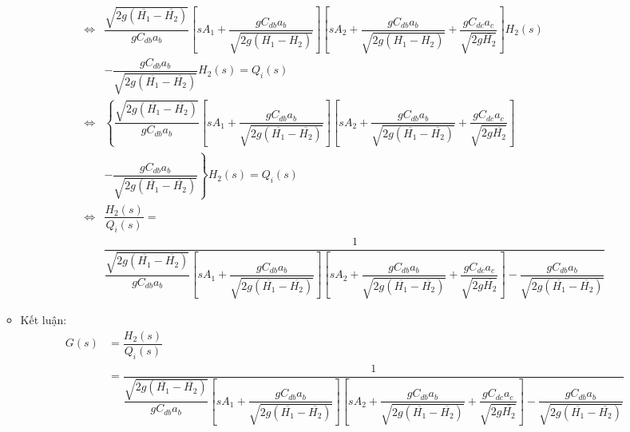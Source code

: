 \begin{enumerate}[\it a.]
\begin{itemize}
\begin{align}
                        \Longleftrightarrow & \dfrac{\sqrt{2g(\overline{H_1} - \overline{H_2})}}{g C_{db}a_b} \left[{s A_1 + \dfrac{gC_{db}a_b}{\sqrt{2g(\overline{H_1} - \overline{H_2})}}}\right] \left[{s A_2 + \dfrac{g C_{db}a_b}{\sqrt{2g(\overline{H_1} - \overline{H_2})}} + \dfrac{g C_{dc}a_c}{\sqrt{2g\overline{H_2}}}}\right] H_2(s) \nonumber \\
                        & - \dfrac{gC_{db}a_b}{\sqrt{2g(\overline{H_1} - \overline{H_2})}} H_2(s) = Q_i(s) \\
                        \Longleftrightarrow & \left\{{\dfrac{\sqrt{2g(\overline{H_1} - \overline{H_2})}}{g C_{db}a_b} \left[{s A_1 + \dfrac{gC_{db}a_b}{\sqrt{2g(\overline{H_1} - \overline{H_2})}}}\right] \left[{s A_2 + \dfrac{g C_{db}a_b}{\sqrt{2g(\overline{H_1} - \overline{H_2})}} + \dfrac{g C_{dc}a_c}{\sqrt{2g\overline{H_2}}}}\right]}\right. \nonumber \\
                        & \left.{- \dfrac{gC_{db}a_b}{\sqrt{2g(\overline{H_1} - \overline{H_2})}}}\right\} H_2(s) = Q_i(s) \\
                        \Longleftrightarrow & \dfrac{H_2(s)}{Q_i(s)} = \nonumber \\
                        & \dfrac{1}{\dfrac{\sqrt{2g(\overline{H_1} - \overline{H_2})}}{g C_{db}a_b} \left[{s A_1 + \dfrac{gC_{db}a_b}{\sqrt{2g(\overline{H_1} - \overline{H_2})}}}\right] \left[{s A_2 + \dfrac{g C_{db}a_b}{\sqrt{2g(\overline{H_1} - \overline{H_2})}} + \dfrac{g C_{dc}a_c}{\sqrt{2g\overline{H_2}}}}\right] - \dfrac{gC_{db}a_b}{\sqrt{2g(\overline{H_1} - \overline{H_2})}}}
                    \end{align}

                \item Kết luận:
                    \begin{align}
                        G(s) & = \dfrac{H_2(s)}{Q_i(s)} \nonumber\\
                        & = \dfrac{1}{\dfrac{\sqrt{2g(\overline{H_1} - \overline{H_2})}}{g C_{db}a_b} \left[{s A_1 + \dfrac{gC_{db}a_b}{\sqrt{2g(\overline{H_1} - \overline{H_2})}}}\right] \left[{s A_2 + \dfrac{g C_{db}a_b}{\sqrt{2g(\overline{H_1} - \overline{H_2})}} + \dfrac{g C_{dc}a_c}{\sqrt{2g\overline{H_2}}}}\right] - \dfrac{gC_{db}a_b}{\sqrt{2g(\overline{H_1} - \overline{H_2})}}}
                    \end{align}
            \end{itemize}
    \end{enumerate}
